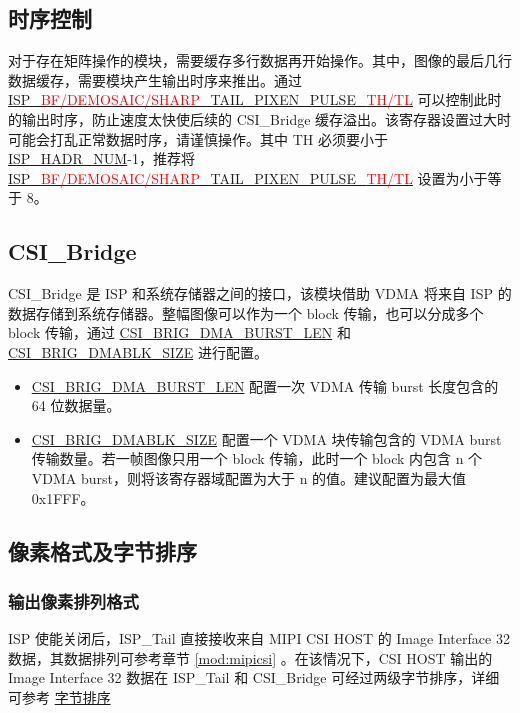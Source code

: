 \documentclass[main\_\_CN.tex]{subfiles}
\begin{document}
\subsection{时序控制}
对于存在矩阵操作的模块，需要缓存多行数据再开始操作。其中，图像的最后几行数据缓存，需要模块产生输出时序来推出。通过 \hyperref[fielddesc:ISPBFTAILPIXENPULSETH]{ISP\_\textcolor{red}{BF/DEMOSAIC/SHARP}\_TAIL\_PIXEN\_PULSE\_\textcolor{red}{TH/TL}} 可以控制此时的输出时序，防止速度太快使后续的 CSI\_Bridge 缓存溢出。该寄存器设置过大时可能会打乱正常数据时序，请谨慎操作。其中 TH 必须要小于 \hyperref[fielddesc:ISPHADRNUM]{ISP\_HADR\_NUM}-1，推荐将 \hyperref[fielddesc:ISPBFTAILPIXENPULSETH]{ISP\_\textcolor{red}{BF/DEMOSAIC/SHARP}\_TAIL\_PIXEN\_PULSE\_\textcolor{red}{TH/TL}} 设置为小于等于 8。


\subsection{CSI\_Bridge}
CSI\_Bridge 是 ISP 和系统存储器之间的接口，该模块借助 VDMA 将来自 ISP 的数据存储到系统存储器。整幅图像可以作为一个 block 传输，也可以分成多个 block 传输，通过 \hyperref[fielddesc:CSIBRIGDMABURSTLEN]{CSI\_BRIG\_DMA\_BURST\_LEN} 和 \hyperref[fielddesc:CSIBRIGDMABLKSIZE]{CSI\_BRIG\_DMABLK\_SIZE} 进行配置。

\begin{itemize}
    \item \hyperref[fielddesc:CSIBRIGDMABURSTLEN]{CSI\_BRIG\_DMA\_BURST\_LEN} 配置一次 VDMA 传输 burst 长度包含的 64 位数据量。
    \item \hyperref[fielddesc:CSIBRIGDMABLKSIZE]{CSI\_BRIG\_DMABLK\_SIZE} 配置一个 VDMA 块传输包含的 VDMA burst 传输数量。若一帧图像只用一个 block 传输，此时一个 block 内包含 n 个 VDMA burst，则将该寄存器域配置为大于 n 的值。建议配置为最大值 0x1FFF。
\end{itemize}

\subsection{像素格式及字节排序}
\subsubsection{输出像素排列格式}
ISP 使能关闭后，ISP\_Tail 直接接收来自 MIPI CSI HOST 的 Image Interface 32 数据，其数据排列可参考章节 \ref{mod:mipicsi} \textit{}。在该情况下，CSI HOST 输出的 Image Interface 32 数据在 ISP\_Tail 和 CSI\_Bridge 可经过两级字节排序，详细可参考 \hyperref[sec:isp_byte_order]{字节排序}
\end{document}
